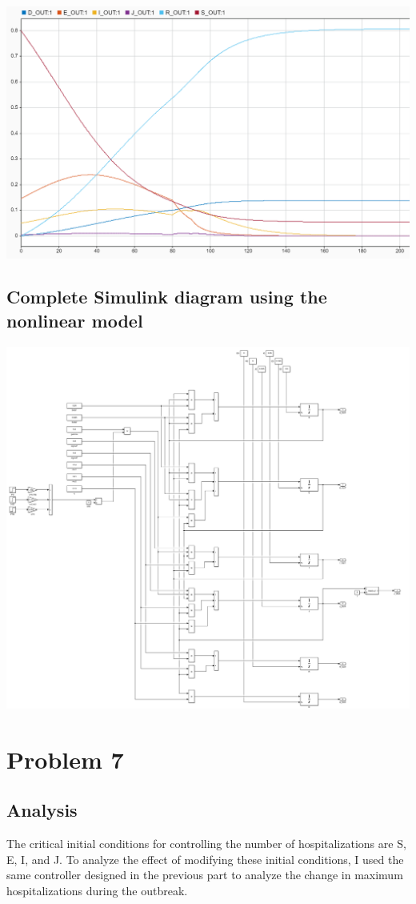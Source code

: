 \documentclass[fleqn]{article}
\begin{document}
\begin{center}
    \includegraphics[width=0.8\linewidth]{controlled_outbreak_simulink}
\end{center}

\subsection*{Complete Simulink diagram using the nonlinear model}
\begin{center}
    \includegraphics[width=0.7\linewidth]{controlled_simulink}
\end{center}

\section*{Problem 7}
\subsection*{Analysis}
The critical initial conditions for controlling the number of hospitalizations are S, E, I, and J. To analyze the effect of modifying these initial conditions, I used the same controller designed in the previous part to analyze the change in maximum hospitalizations during the outbreak.
\end{document}
